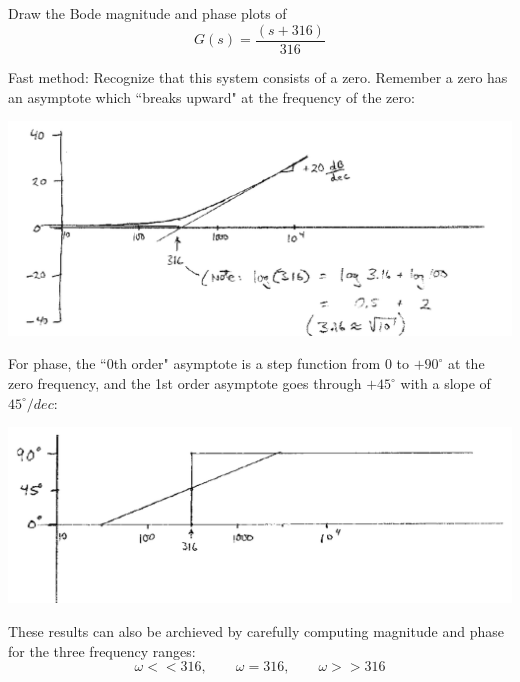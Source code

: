 \documentclass{article}	%
\begin{document}


\subsection{}

Draw the Bode magnitude and phase plots of
\[
G(s) = \frac{(s+316)}{316}
\]


\begin{solution}
Fast method:   Recognize that this system consists of a zero.  Remember a zero has an asymptote which ``breaks upward" at the frequency of the zero:

\includegraphics[width=5.5in]{00951a.png}

For phase, the ``0th order" asymptote is a step function from 0 to $+90^\circ$ at the zero frequency, and the 1st order asymptote goes through $+45^\circ$ with a slope of $45^\circ/dec$:

\includegraphics[width=5.5in]{00952a.png}

These results can also be archieved by carefully computing magnitude and phase for the three frequency ranges:
\[
\omega << 316, \qquad \omega = 316, \qquad \omega >> 316
\]

\end{solution}

\end{document}
